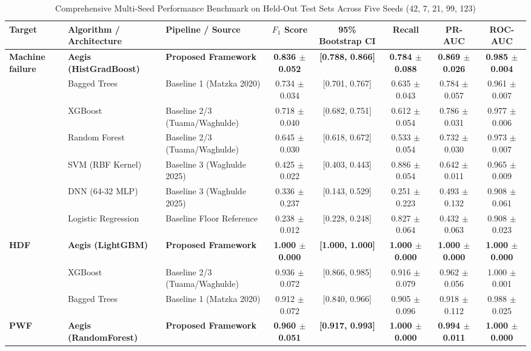 \documentclass[conference]{IEEEtran}
\begin{document}
\begin{table}[t]
\caption{Comprehensive Multi-Seed Performance Benchmark on Held-Out Test Sets Across Five Seeds (42, 7, 21, 99, 123)}
\centering
\begin{tabular}{lllccccc}
\toprule
\textbf{Target} & \textbf{Algorithm / Architecture} & \textbf{Pipeline / Source} & \textbf{$F_1$ Score} & \textbf{95\% Bootstrap CI} & \textbf{Recall} & \textbf{PR-AUC} & \textbf{ROC-AUC} \\
\midrule
\multirow{7}{*}{\textbf{Machine failure}} & \textbf{Aegis (HistGradBoost)} & \textbf{Proposed Framework} & \textbf{0.836 $\pm$ 0.052} & \textbf{[0.788, 0.866]} & \textbf{0.784 $\pm$ 0.088} & \textbf{0.869 $\pm$ 0.026} & \textbf{0.985 $\pm$ 0.004} \\
 & Bagged Trees & Baseline 1 (Matzka 2020) & 0.734 $\pm$ 0.034 & [0.701, 0.767] & 0.635 $\pm$ 0.043 & 0.784 $\pm$ 0.057 & 0.961 $\pm$ 0.007 \\
 & XGBoost & Baseline 2/3 (Tuama/Waghulde) & 0.718 $\pm$ 0.040 & [0.682, 0.751] & 0.612 $\pm$ 0.054 & 0.786 $\pm$ 0.031 & 0.977 $\pm$ 0.006 \\
 & Random Forest & Baseline 2/3 (Tuama/Waghulde) & 0.645 $\pm$ 0.030 & [0.618, 0.672] & 0.533 $\pm$ 0.054 & 0.732 $\pm$ 0.030 & 0.973 $\pm$ 0.007 \\
 & SVM (RBF Kernel) & Baseline 3 (Waghulde 2025) & 0.425 $\pm$ 0.022 & [0.403, 0.443] & 0.886 $\pm$ 0.054 & 0.642 $\pm$ 0.011 & 0.965 $\pm$ 0.009 \\
 & DNN (64-32 MLP) & Baseline 3 (Waghulde 2025) & 0.336 $\pm$ 0.237 & [0.143, 0.529] & 0.251 $\pm$ 0.223 & 0.493 $\pm$ 0.132 & 0.908 $\pm$ 0.061 \\
 & Logistic Regression & Baseline Floor Reference & 0.238 $\pm$ 0.012 & [0.228, 0.248] & 0.827 $\pm$ 0.064 & 0.432 $\pm$ 0.063 & 0.908 $\pm$ 0.023 \\
\midrule
\multirow{3}{*}{\textbf{HDF}} & \textbf{Aegis (LightGBM)} & \textbf{Proposed Framework} & \textbf{1.000 $\pm$ 0.000} & \textbf{[1.000, 1.000]} & \textbf{1.000 $\pm$ 0.000} & \textbf{1.000 $\pm$ 0.000} & \textbf{1.000 $\pm$ 0.000} \\
 & XGBoost & Baseline 2/3 (Tuama/Waghulde) & 0.936 $\pm$ 0.072 & [0.866, 0.985] & 0.916 $\pm$ 0.079 & 0.962 $\pm$ 0.056 & 1.000 $\pm$ 0.001 \\
 & Bagged Trees & Baseline 1 (Matzka 2020) & 0.912 $\pm$ 0.072 & [0.840, 0.966] & 0.905 $\pm$ 0.096 & 0.918 $\pm$ 0.112 & 0.988 $\pm$ 0.025 \\
\midrule
\multirow{3}{*}{\textbf{PWF}} & \textbf{Aegis (RandomForest)} & \textbf{Proposed Framework} & \textbf{0.960 $\pm$ 0.051} & \textbf{[0.917, 0.993]} & \textbf{1.000 $\pm$ 0.000} & \textbf{0.994 $\pm$ 0.011} & \textbf{1.000 $\pm$ 0.000} \\

\end{tabular}
\end{table}
\end{document}
